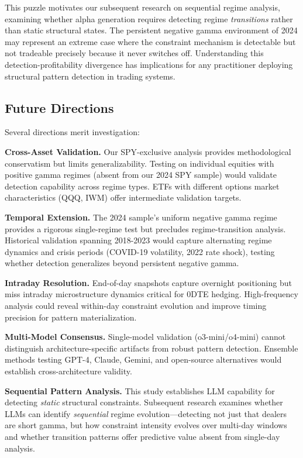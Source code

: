 This puzzle motivates our subsequent research on sequential regime analysis, examining whether alpha generation requires detecting regime \textit{transitions} rather than static structural states. The persistent negative gamma environment of 2024 may represent an extreme case where the constraint mechanism is detectable but not tradeable precisely because it never switches off. Understanding this detection-profitability divergence has implications for any practitioner deploying structural pattern detection in trading systems.

\subsection{Future Directions}

Several directions merit investigation:

\textbf{Cross-Asset Validation.} Our SPY-exclusive analysis provides methodological conservatism but limits generalizability. Testing on individual equities with positive gamma regimes (absent from our 2024 SPY sample) would validate detection capability across regime types. ETFs with different options market characteristics (QQQ, IWM) offer intermediate validation targets.

\textbf{Temporal Extension.} The 2024 sample's uniform negative gamma regime provides a rigorous single-regime test but precludes regime-transition analysis. Historical validation spanning 2018-2023 would capture alternating regime dynamics and crisis periods (COVID-19 volatility, 2022 rate shock), testing whether detection generalizes beyond persistent negative gamma.

\textbf{Intraday Resolution.} End-of-day snapshots capture overnight positioning but miss intraday microstructure dynamics critical for 0DTE hedging. High-frequency analysis could reveal within-day constraint evolution and improve timing precision for pattern materialization.

\textbf{Multi-Model Consensus.} Single-model validation (o3-mini/o4-mini) cannot distinguish architecture-specific artifacts from robust pattern detection. Ensemble methods testing GPT-4, Claude, Gemini, and open-source alternatives would establish cross-architecture validity.

\textbf{Sequential Pattern Analysis.} This study establishes LLM capability for detecting \textit{static} structural constraints. Subsequent research examines whether LLMs can identify \textit{sequential} regime evolution—detecting not just that dealers are short gamma, but how constraint intensity evolves over multi-day windows and whether transition patterns offer predictive value absent from single-day analysis.

